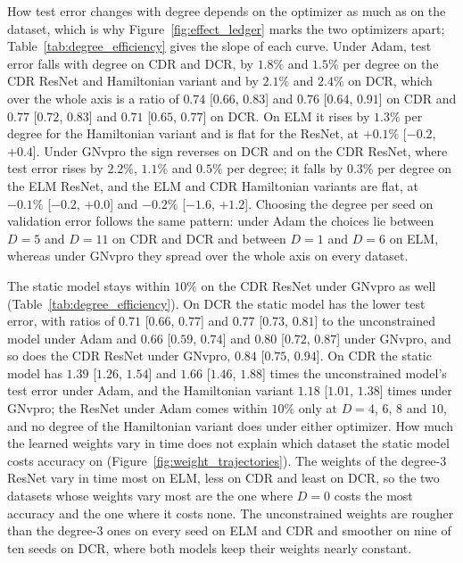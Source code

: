 \documentclass[pdflatex,sn-mathphys-num]{sn-jnl}%
\theoremstyle{thmstyleone}%
\theoremstyle{thmstyletwo}%
\theoremstyle{thmstylethree}%
\begin{document}
How test error changes with degree depends on the optimizer as much as on the dataset, which is why Figure~\ref{fig:effect_ledger} marks the two optimizers apart; Table~\ref{tab:degree_efficiency} gives the slope of each curve.
%
Under Adam, test error falls with degree on CDR and DCR, by $1.8\%$ and $1.5\%$ per degree on the CDR ResNet and Hamiltonian variant and by $2.1\%$ and $2.4\%$ on DCR, which over the whole axis is a ratio of $0.74$ [$0.66$, $0.83$] and $0.76$ [$0.64$, $0.91$] on CDR and $0.77$ [$0.72$, $0.83$] and $0.71$ [$0.65$, $0.77$] on DCR. On ELM it rises by $1.3\%$ per degree for the Hamiltonian variant and is flat for the ResNet, at $+0.1\%$ [$-0.2$, $+0.4$].
%
Under GNvpro the sign reverses on DCR and on the CDR ResNet, where test error rises by $2.2\%$, $1.1\%$ and $0.5\%$ per degree; it falls by $0.3\%$ per degree on the ELM ResNet, and the ELM and CDR Hamiltonian variants are flat, at $-0.1\%$ [$-0.2$, $+0.0$] and $-0.2\%$ [$-1.6$, $+1.2$].
%
Choosing the degree per seed on validation error follows the same pattern: under Adam the choices lie between $D=5$ and $D=11$ on CDR and DCR and between $D=1$ and $D=6$ on ELM, whereas under GNvpro they spread over the whole axis on every dataset.

The static model stays within $10\%$ on the CDR ResNet under GNvpro as well (Table~\ref{tab:degree_efficiency}).
%
On DCR the static model has the lower test error, with ratios of $0.71$ [$0.66$, $0.77$] and $0.77$ [$0.73$, $0.81$] to the unconstrained model under Adam and $0.66$ [$0.59$, $0.74$] and $0.80$ [$0.72$, $0.87$] under GNvpro, and so does the CDR ResNet under GNvpro, $0.84$ [$0.75$, $0.94$].
%
On CDR the static model has $1.39$ [$1.26$, $1.54$] and $1.66$ [$1.46$, $1.88$] times the unconstrained model's test error under Adam, and the Hamiltonian variant $1.18$ [$1.01$, $1.38$] times under GNvpro; the ResNet under Adam comes within $10\%$ only at $D=4$, $6$, $8$ and $10$, and no degree of the Hamiltonian variant does under either optimizer.
%
How much the learned weights vary in time does not explain which dataset the static model costs accuracy on (Figure~\ref{fig:weight_trajectories}). The weights of the degree-$3$ ResNet vary in time most on ELM, less on CDR and least on DCR, so the two datasets whose weights vary most are the one where $D=0$ costs the most accuracy and the one where it costs none. The unconstrained weights are rougher than the degree-$3$ ones on every seed on ELM and CDR and smoother on nine of ten seeds on DCR, where both models keep their weights nearly constant.
\end{document}
